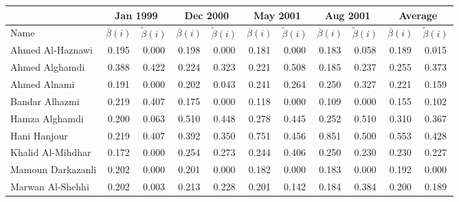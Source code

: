 \begin{subappendices}
\begin{table}
\begin{center}
\begin{tabular}{l cc cccccccc}
\toprule
 & \multicolumn{2}{c}{Jan 1999} & \multicolumn{2}{c}{Dec 2000} & \multicolumn{2}{c}{May 2001} & \multicolumn{2}{c}{Aug 2001} & \multicolumn{2}{c}{Average} \\[1ex]
\midrule
Name  & $\overline{\beta}(i)$ & $\widetilde{\beta}(i)$ & $\overline{\beta}(i)$ & $\widetilde{\beta}(i)$ & $\overline{\beta}(i)$  & $\widetilde{\beta}(i)$ & $\overline{\beta}(i)$ & $\widetilde{\beta}(i)$ & $\overline{\beta}(i)$ & $\widetilde{\beta}(i)$ \\
\midrule
Ahmed Al-Haznawi       & 0.195     & 0.000       & 0.198     & 0.000       & 0.181     & 0.000        & 0.183     & 0.058       & 0.189            & 0.015             \\
Ahmed Alghamdi         & 0.388     & 0.422       & 0.224     & 0.323       & 0.221     & 0.508        & 0.185     & 0.237       & 0.255            & 0.373              \\
Ahmed Alnami           & 0.191     & 0.000       & 0.202     & 0.043       & 0.241     & 0.264        & 0.250     & 0.327       & 0.221            & 0.159              \\
Bandar Alhazmi         & 0.219     & 0.407       & 0.175     & 0.000       & 0.118     & 0.000        & 0.109     & 0.000       & 0.155            & 0.102              \\
Hamza Alghamdi         & 0.200     & 0.063       & 0.510     & 0.448       & 0.278     & 0.445        & 0.252     & 0.510       & 0.310            & 0.367             \\
Hani Hanjour           & 0.219     & 0.407       & 0.392     & 0.350       & 0.751     & 0.456        & 0.851     & 0.500       & 0.553            & 0.428            \\
Khalid Al-Mihdhar      & 0.172     & 0.000       & 0.254     & 0.273       & 0.244     & 0.406        & 0.250     & 0.230       & 0.230            & 0.227              \\
Mamoun Darkazanli      & 0.202     & 0.000       & 0.201     & 0.000       & 0.182     & 0.000        & 0.183     & 0.000       & 0.192            & 0.000               \\
Marwan Al-Shehhi       & 0.202     & 0.003       & 0.213     & 0.228       & 0.201     & 0.142        & 0.184     & 0.384       & 0.200            & 0.189            \\

\end{tabular}
\end{center}
\end{table}
\end{subappendices}

